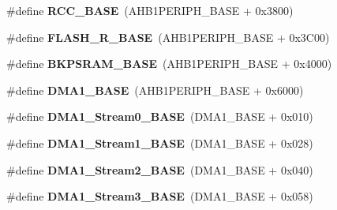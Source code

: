 \begin{DoxyCompactItemize}
\item 
\hypertarget{group___peripheral__memory__map_ga0e681b03f364532055d88f63fec0d99d}{\#define {\bfseries R\-C\-C\-\_\-\-B\-A\-S\-E}~(A\-H\-B1\-P\-E\-R\-I\-P\-H\-\_\-\-B\-A\-S\-E + 0x3800)}\label{group___peripheral__memory__map_ga0e681b03f364532055d88f63fec0d99d}

\item 
\hypertarget{group___peripheral__memory__map_ga8e21f4845015730c5731763169ec0e9b}{\#define {\bfseries F\-L\-A\-S\-H\-\_\-\-R\-\_\-\-B\-A\-S\-E}~(A\-H\-B1\-P\-E\-R\-I\-P\-H\-\_\-\-B\-A\-S\-E + 0x3\-C00)}\label{group___peripheral__memory__map_ga8e21f4845015730c5731763169ec0e9b}

\item 
\hypertarget{group___peripheral__memory__map_ga52e57051bdf8909222b36e5408a48f32}{\#define {\bfseries B\-K\-P\-S\-R\-A\-M\-\_\-\-B\-A\-S\-E}~(A\-H\-B1\-P\-E\-R\-I\-P\-H\-\_\-\-B\-A\-S\-E + 0x4000)}\label{group___peripheral__memory__map_ga52e57051bdf8909222b36e5408a48f32}

\item 
\hypertarget{group___peripheral__memory__map_gab2d8a917a0e4ea99a22ac6ebf279bc72}{\#define {\bfseries D\-M\-A1\-\_\-\-B\-A\-S\-E}~(A\-H\-B1\-P\-E\-R\-I\-P\-H\-\_\-\-B\-A\-S\-E + 0x6000)}\label{group___peripheral__memory__map_gab2d8a917a0e4ea99a22ac6ebf279bc72}

\item 
\hypertarget{group___peripheral__memory__map_ga0d3c52aa35dcc68f78b704dfde57ba95}{\#define {\bfseries D\-M\-A1\-\_\-\-Stream0\-\_\-\-B\-A\-S\-E}~(D\-M\-A1\-\_\-\-B\-A\-S\-E + 0x010)}\label{group___peripheral__memory__map_ga0d3c52aa35dcc68f78b704dfde57ba95}

\item 
\hypertarget{group___peripheral__memory__map_ga5b4152cef577e37eccc9311d8bdbf3c2}{\#define {\bfseries D\-M\-A1\-\_\-\-Stream1\-\_\-\-B\-A\-S\-E}~(D\-M\-A1\-\_\-\-B\-A\-S\-E + 0x028)}\label{group___peripheral__memory__map_ga5b4152cef577e37eccc9311d8bdbf3c2}

\item 
\hypertarget{group___peripheral__memory__map_ga48a551ee91d3f07dd74347fdb35c703d}{\#define {\bfseries D\-M\-A1\-\_\-\-Stream2\-\_\-\-B\-A\-S\-E}~(D\-M\-A1\-\_\-\-B\-A\-S\-E + 0x040)}\label{group___peripheral__memory__map_ga48a551ee91d3f07dd74347fdb35c703d}

\item 
\hypertarget{group___peripheral__memory__map_gac51deb54ff7cfe1290dfcf517ae67127}{\#define {\bfseries D\-M\-A1\-\_\-\-Stream3\-\_\-\-B\-A\-S\-E}~(D\-M\-A1\-\_\-\-B\-A\-S\-E + 0x058)}\label{group___peripheral__memory__map_gac51deb54ff7cfe1290dfcf517ae67127}


\end{DoxyCompactItemize}
